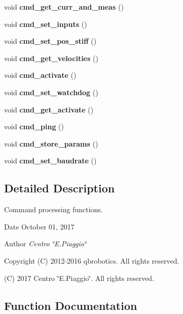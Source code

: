 \begin{DoxyCompactItemize}
void {\bfseries cmd\+\_\+get\+\_\+curr\+\_\+and\+\_\+meas} ()
\item 
\mbox{\label{command__processing_8h_a2d8a4542f55af960a27f875b00aad6a1}} 
void {\bfseries cmd\+\_\+set\+\_\+inputs} ()
\item 
\mbox{\label{command__processing_8h_a7897817859ac33d5a20b710af0f6a044}} 
void {\bfseries cmd\+\_\+set\+\_\+pos\+\_\+stiff} ()
\item 
\mbox{\label{command__processing_8h_a212883283bd7a8f32846615271cad8ce}} 
void {\bfseries cmd\+\_\+get\+\_\+velocities} ()
\item 
\mbox{\label{command__processing_8h_a107fc9f2982f9a953bdd82aa07279499}} 
void {\bfseries cmd\+\_\+activate} ()
\item 
\mbox{\label{command__processing_8h_aa94cd9c2e2fbfc5b98e84f67569cfe82}} 
void {\bfseries cmd\+\_\+set\+\_\+watchdog} ()
\item 
\mbox{\label{command__processing_8h_a554d563001517bfbc44400a1e999b393}} 
void {\bfseries cmd\+\_\+get\+\_\+activate} ()
\item 
\mbox{\label{command__processing_8h_a704f8c8cb0f4d75f243fc2b79bc34188}} 
void {\bfseries cmd\+\_\+ping} ()
\item 
\mbox{\label{command__processing_8h_a1a2493bfc2f30171d7e7a3bd5aebab14}} 
void {\bfseries cmd\+\_\+store\+\_\+params} ()
\item 
\mbox{\label{command__processing_8h_aa86bf1f2fa69ab5927f7e4e40eb40581}} 
void {\bfseries cmd\+\_\+set\+\_\+baudrate} ()
\end{DoxyCompactItemize}


\subsection{Detailed Description}
Command processing functions. 

\begin{DoxyDate}{Date}
October 01, 2017 
\end{DoxyDate}
\begin{DoxyAuthor}{Author}
{\itshape Centro \char`\"{}\+E.\+Piaggio\char`\"{}} 
\end{DoxyAuthor}
\begin{DoxyCopyright}{Copyright}
(C) 2012-\/2016 qbrobotics. All rights reserved. 

(C) 2017 Centro \char`\"{}\+E.\+Piaggio\char`\"{}. All rights reserved. 
\end{DoxyCopyright}


\subsection{Function Documentation}
\mbox{\label{command__processing_8h_af5ccd403f1d3e49c97bafd6e7713cff3}} 
